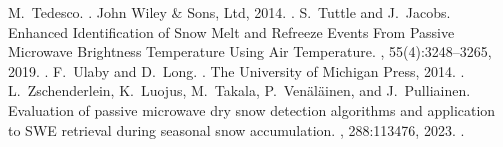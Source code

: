 \documentclass[letterpaper,10pt,english]{jupyterBook}
\begin{document}
\begin{sphinxthebibliography}{10}
\sphinxAtStartPar
M. Tedesco. . John Wiley \& Sons, Ltd, 2014. .
\sphinxAtStartPar
S. Tuttle and J. Jacobs. Enhanced Identification of Snow Melt and Refreeze Events From Passive Microwave Brightness Temperature Using Air Temperature. , 55(4):3248–3265, 2019. .
\sphinxAtStartPar
F. Ulaby and D. Long. . The University of Michigan Press, 2014. .
\sphinxAtStartPar
L. Zschenderlein, K. Luojus, M. Takala, P. Venäläinen, and J. Pulliainen. Evaluation of passive microwave dry snow detection algorithms and application to SWE retrieval during seasonal snow accumulation. , 288:113476, 2023. .
\end{sphinxthebibliography}







\renewcommand{\indexname}{Index}
\printindex
\end{document}
